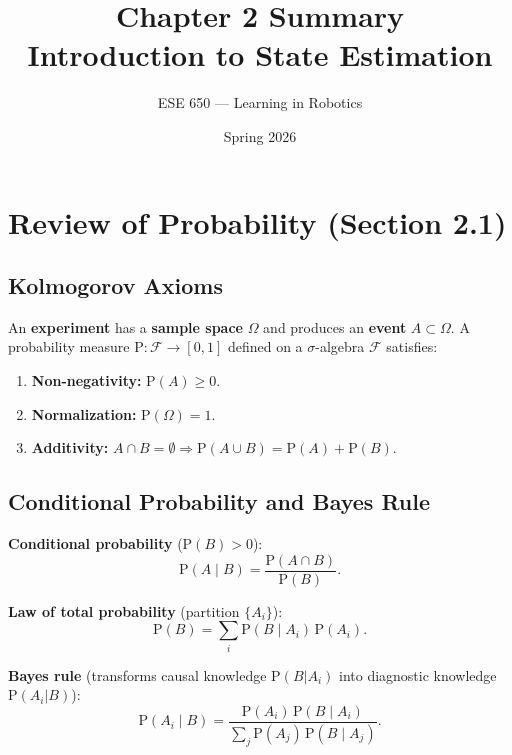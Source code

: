 \documentclass[12pt, a4paper]{article}
\title{\textbf{Chapter 2 Summary}\\[0.3em]
\large Introduction to State Estimation}
\author{ESE 650 --- Learning in Robotics}
\date{Spring 2026}
\begin{document}
\maketitle
\tableofcontents
\newpage

\section{Review of Probability (Section 2.1)}

\subsection{Kolmogorov Axioms}

An \textbf{experiment} has a \textbf{sample space} $\Omega$ and produces an
\textbf{event} $A\subset\Omega$. A probability measure $\mathrm{P}:\mathcal{F}\to[0,1]$
defined on a $\sigma$-algebra $\mathcal{F}$ satisfies:
\begin{enumerate}
  \item \textbf{Non-negativity:} $\mathrm{P}(A)\ge0$.
  \item \textbf{Normalization:} $\mathrm{P}(\Omega)=1$.
  \item \textbf{Additivity:} $A\cap B=\emptyset \Rightarrow \mathrm{P}(A\cup B)=\mathrm{P}(A)+\mathrm{P}(B)$.
\end{enumerate}

\subsection{Conditional Probability and Bayes Rule}

\textbf{Conditional probability} ($\mathrm{P}(B)>0$):
\begin{equation}
  \mathrm{P}(A\mid B) = \frac{\mathrm{P}(A\cap B)}{\mathrm{P}(B)}.
  \label{eq:cond}
\end{equation}

\textbf{Law of total probability} (partition $\{A_i\}$):
\begin{equation}
  \mathrm{P}(B) = \sum_i \mathrm{P}(B\mid A_i)\,\mathrm{P}(A_i).
\end{equation}

\textbf{Bayes rule} (transforms causal knowledge $\mathrm{P}(B|A_i)$ into
diagnostic knowledge $\mathrm{P}(A_i|B)$):
\begin{equation}
  \mathrm{P}(A_i\mid B) = \frac{\mathrm{P}(A_i)\,\mathrm{P}(B\mid A_i)}{\sum_j \mathrm{P}(A_j)\,\mathrm{P}(B\mid A_j)}.
  \label{eq:bayes}
\end{equation}
\end{document}
